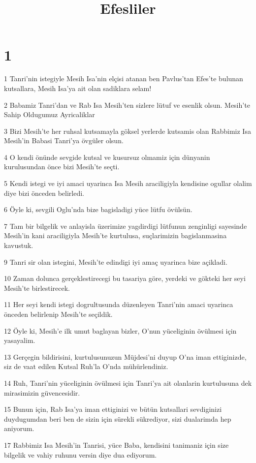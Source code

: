 

\title{Efesliler}


\chapter{1}

\par 1 Tanri'nin istegiyle Mesih Isa'nin elçisi atanan ben Pavlus'tan Efes'te bulunan kutsallara, Mesih Isa'ya ait olan sadiklara selam!
\par 2 Babamiz Tanri'dan ve Rab Isa Mesih'ten sizlere lütuf ve esenlik olsun. Mesih'te Sahip Oldugumuz Ayricaliklar
\par 3 Bizi Mesih'te her ruhsal kutsamayla göksel yerlerde kutsamis olan Rabbimiz Isa Mesih'in Babasi Tanri'ya övgüler olsun.
\par 4 O kendi önünde sevgide kutsal ve kusursuz olmamiz için dünyanin kurulusundan önce bizi Mesih'te seçti.
\par 5 Kendi istegi ve iyi amaci uyarinca Isa Mesih araciligiyla kendisine ogullar olalim diye bizi önceden belirledi.
\par 6 Öyle ki, sevgili Oglu'nda bize bagisladigi yüce lütfu övülsün.
\par 7 Tam bir bilgelik ve anlayisla üzerimize yagdirdigi lütfunun zenginligi sayesinde Mesih'in kani araciligiyla Mesih'te kurtulusa, suçlarimizin bagislanmasina kavustuk.
\par 9 Tanri sir olan istegini, Mesih'te edindigi iyi amaç uyarinca bize açikladi.
\par 10 Zaman dolunca gerçeklestirecegi bu tasariya göre, yerdeki ve gökteki her seyi Mesih'te birlestirecek.
\par 11 Her seyi kendi istegi dogrultusunda düzenleyen Tanri'nin amaci uyarinca önceden belirlenip Mesih'te seçildik.
\par 12 Öyle ki, Mesih'e ilk umut baglayan bizler, O'nun yüceliginin övülmesi için yasayalim.
\par 13 Gerçegin bildirisini, kurtulusunuzun Müjdesi'ni duyup O'na iman ettiginizde, siz de vaat edilen Kutsal Ruh'la O'nda mühürlendiniz.
\par 14 Ruh, Tanri'nin yüceliginin övülmesi için Tanri'ya ait olanlarin kurtulusuna dek mirasimizin güvencesidir.
\par 15 Bunun için, Rab Isa'ya iman ettiginizi ve bütün kutsallari sevdiginizi duydugumdan beri ben de sizin için sürekli sükrediyor, sizi dualarimda hep aniyorum.
\par 17 Rabbimiz Isa Mesih'in Tanrisi, yüce Baba, kendisini tanimaniz için size bilgelik ve vahiy ruhunu versin diye dua ediyorum.
